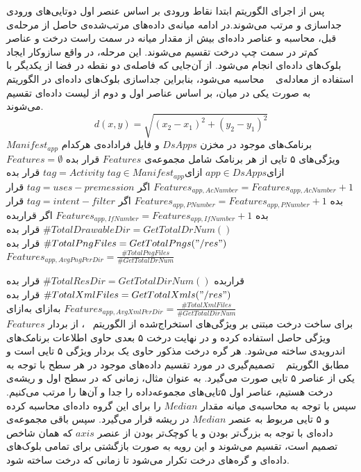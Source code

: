پس از اجرای الگوریتم ابتدا نقاط ورودی بر اساس عنصر اول دوتایی‌های ورودی جداسازی و مرتب‌ می‌شوند.در ادامه میانه‌ی داده‌‌های مرتب‌شده‌ی حاصل از مرحله‌ی قبل، محاسبه و عناصر داده‌ای بیش از مقدار میانه در سمت راست درخت و عناصر کم‌تر در سمت چپ درخت تقسیم می‌شوند. این مرحله‌، در واقع سازو‌کار ایجاد بلوک‌های داده‌ای انجام می‌شود. از آن‌جایی که فاصله‌ی دو نقطه در فضا از یکدیگر با استفاده از معادله‌ی ~ محاسبه می‌شود، بنابراین جداسازی بلوک‌های داده‌ای در الگوریتم ~ به صورت یکی در میان، بر اساس عناصر اول و دوم از لیست داده‌ای تقسیم می‌شوند.
\begin{equation}
	d(x,y)=\sqrt{(x_{2}-x_{1})^2 + (y_{2}-y_{1})^2} \label{eq:1}
\end{equation}
 برنامک‌های موجود در مخزن $DsApps$ و فایل فراداده‌ی هرکدام‌ $Manifest_{app}$
 ویژگی‌های ۵ تایی از هر برنامک شامل مجموعه‌ی $Features$
 قرار بده $Features=\emptyset$
‌ازای{$app \in  DsApps$} 
‌ازای{$tag \in Manifest_{app}$}
 $tag=Activity$
 قرار بده $Features_{app,AcNumber} =Features_{app,AcNumber} + 1 $
‌اگر
 $tag=uses-premession$
 قرار بده $Features_{app,PNumber} =Features_{app,PNumber} + 1 $
‌اگر
 $tag=intent-filter$
 قرار بده $Features_{app,IfNumber} =Features_{app,IfNumber} + 1 $
‌اگر
 قرار‌بده $\#TotalDrawableDir = GetTotalDrNum()$
 قرار بده $\#TotalPngFiles = GetTotalPngs("/res")$
 قرار بده $Features_{app,AvgPngPerDir}=  \frac{\#TotalPngFiles}{\#GetTotalDrNum}$

 قرار‌بده $\#TotalResDir = GetTotalDirNum()$
 قرار بده $\#TotalXmlFiles = GetTotalXmls("/res")$
 قرار بده $Features_{app,AvgXmlPerDir}=  \frac{\#TotalXmlFiles}{\#GetTotalDirNum}$
‌به‌ازای
‌به‌ازای\\
 $Features$
برای ساخت درخت مبتنی بر ویژگی‌های استخراج‌شده از الگوریتم ~، از بردار ویژگی حاصل استفاده کرده و در نهایت درخت ۵ بعدی حاوی اطلاعات برنامک‌های اندرویدی ساخته می‌شود. هر گره درخت مذکور حاوی یک بردار ویژگی ۵ تایی است و مطابق الگوریتم ~ تصمیم‌گیری در مورد تقسیم داده‌های موجود در هر سطح با توجه به یکی از عناصر ۵ تایی صورت می‌گیرد. به عنوان مثال، زمانی که در سطح اول و ریشه‌ی درخت هستیم، عناصر اول ۵‌تایی‌های مجموعه‌داده را جدا و آن‌ها را مرتب می‌کنیم. سپس با توجه به محاسبه‌ی میانه مقدار $Median$ را برای این گروه داده‌ای محاسبه کرده و ۵ تایی مربوط به عنصر $Median$ در ریشه قرار می‌گیرد. سپس باقی مجموعه‌ی داده‌ای با توجه به بزرگ‌تر بودن و یا کوچک‌تر بودن از عنصر  $axis$ که همان شاخص تصمیم است، تقسیم می‌شوند و این رویه به صورت بازگشتی برای تمامی بلوک‌های داده‌ای و گره‌های درخت تکرار می‌شود تا زمانی که درخت ساخته شود.

